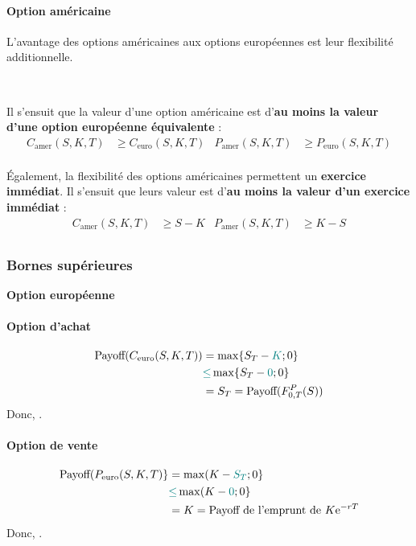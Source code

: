 \documentclass[10pt, french]{article}
\begin{document}
\begin{multicols*}{2}
\paragraph{Option américaine}	L'avantage des options américaines aux options européennes est leur flexibilité additionnelle.

\

Il s'ensuit que la valeur d'une option américaine est d'\textbf{au moins la valeur d'une option européenne équivalente} : 
\begin{align*}
	C_{\text{amer}}(S, K, T)	
	&\geq	C_{\text{euro}}(S, K, T)		&
	P_{\text{amer}}(S, K, T)	
	&\geq	P_{\text{euro}}(S, K, T)		\\
\end{align*}

Également, la flexibilité des options américaines permettent un \textbf{exercice immédiat}. Il s'ensuit que leurs valeur est d'\textbf{au moins la valeur d'un exercice immédiat} :
\begin{align*}
	C_{\text{amer}}(S, K, T)	
	&\geq	S	-	K		&
	P_{\text{amer}}(S, K, T)	
	&\geq	K	-	S		\\
\end{align*}


\subsubsection*{Bornes supérieures}
\begin{center}
	\textbf{Option européenne}
\end{center}

\paragraph{Option d'achat}
\begin{align*}
	\text{Payoff}(C_{\text{euro}}(S, K, T))
	&=	\max\{S_{T}	-	\textcolor{teal}{K}; 0\}	\\
	&\textcolor{teal}{\leq}	\max\{S_{T}	-	\textcolor{teal}{0}; 0\}	\\
	&=	S_{T}	
	=	\text{Payoff}(F_{0, T}^{P}(S))
\end{align*}
Donc, .


\paragraph{Option de vente}
\begin{align*}
	\text{Payoff}(P_{\text{euro}}(S, K, T)\}
	&=	\max(K	-	\textcolor{teal}{S_{T}}; 0\}	\\
	&\textcolor{teal}{\leq}	\max(K	-	\textcolor{teal}{0}; 0\}	\\
	&=	K
	=	\text{Payoff de l'emprunt de $K\textrm{e}^{-rT}$}
\end{align*}
Donc, .



\end{multicols*}
\end{document}
